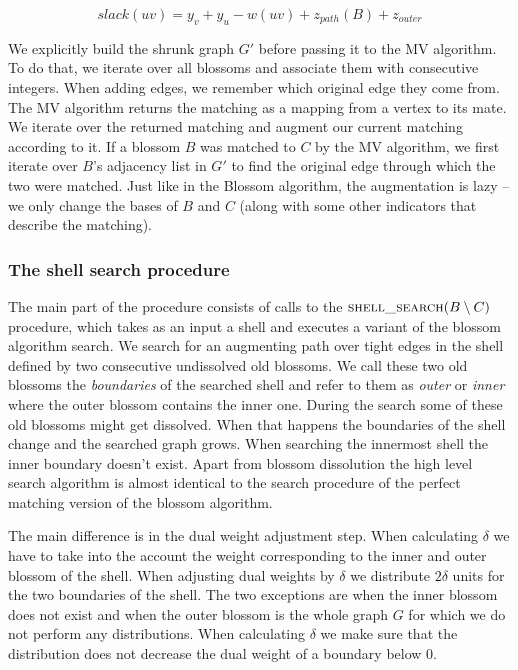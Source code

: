 \[ slack(uv) = y_v + y_u - w(uv) + z_{path}(B) + z_{outer} \]

We explicitly build the shrunk graph $G'$ before passing it to the MV algorithm. To do that, we iterate over all blossoms and associate them with consecutive integers. When adding edges, we remember which original edge they come from. The MV algorithm returns the matching as a mapping from a vertex to its mate. We iterate over the returned matching and augment our current matching according to it. If a blossom $B$ was matched to $C$ by the MV algorithm, we first iterate over $B$'s adjacency list in $G'$ to find the original edge through which the two were matched. Just like in the Blossom algorithm, the augmentation is lazy – we only change the bases of $B$ and $C$ (along with some other indicators that describe the matching).

\subsubsection{The shell search procedure}

The main part of the procedure consists of calls to the $\textsc{shell\_search}(B \setminus C)$ procedure, which takes as an input a shell and executes a variant of the blossom algorithm search. We search for an augmenting path over tight edges in the shell defined by two consecutive undissolved old blossoms. We call these two old blossoms the \textit{boundaries} of the searched shell and refer to them as \textit{outer} or \textit{inner} where the outer blossom contains the inner one. During the search some of these old blossoms might get dissolved. When that happens the boundaries of the shell change and the searched graph grows. When searching the innermost shell the inner boundary doesn't exist. Apart from blossom dissolution the high level search algorithm is almost identical to the search procedure of the perfect matching version of the blossom algorithm.

The main difference is in the dual weight adjustment step. When calculating $\delta$ we have to take into the account the weight corresponding to the inner and outer blossom of the shell. When adjusting dual weights by $\delta$ we distribute $2\delta$ units for the two boundaries of the shell. The two exceptions are when the inner blossom does not exist and when the outer blossom is the whole graph $G$ for which we do not perform any distributions. When calculating $\delta$ we make sure that the distribution does not decrease the dual weight of a boundary below $0$.

